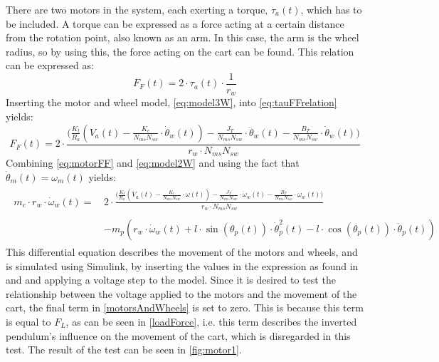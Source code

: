 There are two motors in the system, each exerting a torque, $\tau_a(t)$, which has to be included. A torque can be expressed as a force acting at a certain distance from the rotation point, also known as an arm. In this case, the arm is the wheel radius, so by using this, the force acting on the cart can be found. This relation can be expressed as:
\begin{equation}
F_F(t) = 2\cdot \tau_a(t) \cdot \frac{1}{r_w}\label{eq:tauFFrelation}
\end{equation}
Inserting the motor and wheel model, \autoref{eq:model3W}, into \autoref{eq:tauFFrelation} yields:
\begin{equation}
F_F(t) = 2\cdot \frac{\Big(\frac{K_t}{R_a} \left( V_a(t) - \frac{K_e}{N_{ms} N_{sw}} \cdot \dot\theta_w(t) \right) - \frac{J_{T}}{N_{ms} N_{sw}} \cdot \ddot\theta_w(t) - \frac{B_{T}}{N_{ms} N_{sw}} \cdot \dot\theta_w(t) \Big)}{r_w \cdot N_{ms} N_{sw}}\label{eq:motorFF}
\end{equation}
Combining \autoref{eq:motorFF} and \autoref{eq:model2W} and using the fact that $\dot \theta_m(t) = \omega_m(t)$ yields:
\begin{align}
\begin{split}
m_c \cdot r_w \cdot \dot \omega_w(t) = \, &2 \cdot \frac{\Big(\frac{K_t}{R_a} \left( V_a(t) -  \frac{K_e}{N_{ms} N_{sw}} \cdot \omega(t) \right) - \frac{J_{T}}{N_{ms} N_{sw}} \cdot \dot\omega_w(t) - \frac{B_{T}}{N_{ms} N_{sw}} \cdot \omega_w(t) \Big)}{r_w \cdot N_{ms} N_{sw}} \\ \\
 &- m_p\left(r_w \cdot \dot \omega_w(t) + l \cdot \sin(\theta_p(t))\cdot \dot\theta_p^2(t) - l \cdot \cos(\theta_p(t))\cdot \ddot\theta_p(t)\right)
\end{split}\label{motorsAndWheels}
\end{align}
This differential equation describes the movement of the motors and wheels, and is simulated using Simulink, by inserting the values in the expression as found in  and  and applying a voltage step to the model. Since it is desired to test the relationship between the voltage applied to the motors and the movement of the cart, the final term in \autoref{motorsAndWheels} is set to zero. This is because this term is equal to $F_L$, as can be seen in \autoref{loadForce}, i.e. this term describes the inverted pendulum's influence on the movement of the cart, which is disregarded in this test. The result of the test can be seen in \autoref{fig:motor1}. 
